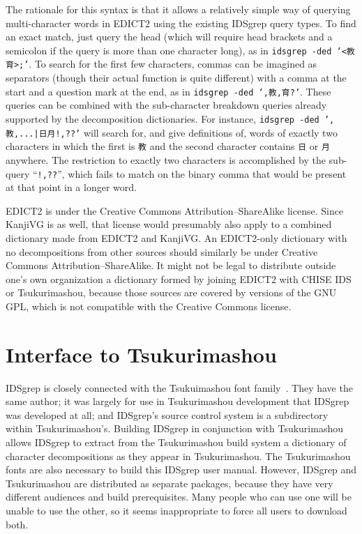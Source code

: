 \documentclass[twocolumn]{report}
\begin{document}
The rationale for this syntax is that it allows a relatively simple way of
querying multi-character words in EDICT2 using the existing IDSgrep query
types.  To find an exact match, just query the head (which will require head
brackets and a semicolon if the query is more than one character long), as
in \texttt{idsgrep -ded '<教育>;'}.  To search for the first few characters,
commas can be imagined as separators (though their actual function is quite
different) with a comma at the start and a question mark at the end, as in
\texttt{idsgrep -ded ',教,育?'}.  These queries can be combined with the
sub-character breakdown queries already supported by the decomposition
dictionaries.  For instance, \texttt{idsgrep -ded ',教,...|日月!,??'} will
search for, and give definitions of, words of exactly two characters in
which the first is \texttt{教} and the second character contains \texttt{日}
or \texttt{月} anywhere.  The restriction to exactly two characters is
accomplished by the sub-query ``\texttt{!,??}'', which fails to match on the
binary comma that would be present at that point in a longer word.

EDICT2 is under the Creative Commons Attribution--ShareAlike license.  Since
KanjiVG is as well, that license would presumably also apply to a combined
dictionary made from EDICT2 and KanjiVG.  An EDICT2-only dictionary with no
decompositions from other sources should similarly be under Creative Commons
Attribution--ShareAlike.  It might not be legal to distribute outside one's
own organization a dictionary formed by joining EDICT2 with CHISE IDS or
Tsukurimashou, because those sources are covered by versions of the GNU GPL,
which is not compatible with the Creative Commons license.


\section{Interface to Tsukurimashou}

IDSgrep is closely connected with the Tsukuimashou font
family~\cite{Tsukurimashou}.  They have the same author; it was largely for
use in Tsukurimashou development that IDSgrep was developed at all; and
IDSgrep's source control system is a subdirectory within Tsukurimashou's. 
Building IDSgrep in conjunction with Tsukurimashou allows IDSgrep to extract
from the Tsukurimashou build system a dictionary of character decompositions
as they appear in Tsukurimashou.  The Tsukurimashou fonts are also necessary
to build this IDSgrep user manual. However, IDSgrep and Tsukurimashou
are distributed as separate packages, because they have very different
audiences and build prerequisites.  Many people who can use one will be
unable to use the other, so it seems inappropriate to force all users to
download both.
\end{document}
